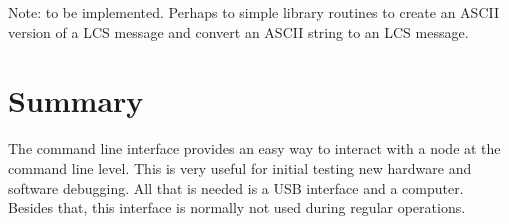 

Note: to be implemented. Perhaps to simple library routines to create an ASCII version of a LCS message and convert an ASCII string to an LCS message.

\section{Summary}

The command line interface provides an easy way to interact with a node at the command line level. This is very useful for initial testing new hardware and software debugging. All that is needed is a USB interface and a computer. Besides that, this interface is normally not used during regular operations.